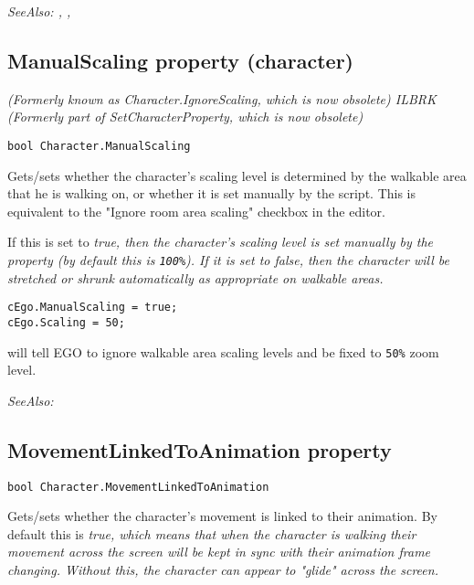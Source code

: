 \it{SeeAlso:} ,
,


\subsection{ManualScaling property (character)}\label{Character.ManualScaling}%

\it{(Formerly known as Character.IgnoreScaling, which is now obsolete)} ILBRK
\it{(Formerly part of SetCharacterProperty, which is now obsolete)}

\begin{verbatim}
bool Character.ManualScaling
\end{verbatim}
Gets/sets whether the character's scaling level is determined by the walkable area that
he is walking on, or whether it is set manually by the script. This is equivalent
to the "Ignore room area scaling" checkbox in the editor.

If this is set to \it{true}, then the character's scaling level is set manually by the
 property (by default this is \verb$100%$).
If it is set to \it{false}, then the character will be stretched or shrunk
automatically as appropriate on walkable areas.

\begin{verbatim}
cEgo.ManualScaling = true;
cEgo.Scaling = 50;
\end{verbatim}
will tell EGO to ignore walkable area scaling levels and be fixed to \verb$50%$ zoom level.

\it{SeeAlso:} 


\subsection{MovementLinkedToAnimation property}\label{Character.MovementLinkedToAnimation}%

\begin{verbatim}
bool Character.MovementLinkedToAnimation
\end{verbatim}
Gets/sets whether the character's movement is linked to their animation. By default
this is \it{true}, which means that when the character is walking their movement across
the screen will be kept in sync with their animation frame changing. Without this, the
character can appear to "glide" across the screen.

